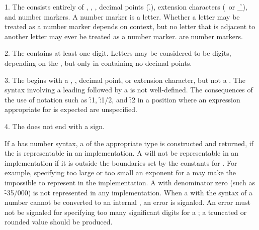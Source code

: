 \beginlist
\item{1.}
The  consists entirely of 
  ,
  ,
  ,
  decimal points (\f{.}),
  extension characters (\hat\ or \f{\_}),
  and number markers.
A number marker is a letter. 
Whether a letter may be treated as a number marker depends on context,
but no letter that is adjacent to another letter may ever be treated as a number marker.
 are number markers.

\item{2.}
The  contains at least one digit.  Letters may be considered to be
digits, depending on the , but only
in  containing no decimal points.


\item{3.}
The  begins with a , , decimal point, or extension character,
but not a 
.
The syntax involving a leading 
 followed by a  is
not well-defined. The consequences of the use 
of notation such as \f{:1}, \f{:1/2}, and \f{:2} in a
position where an expression appropriate for  
is expected are unspecified.

\item{4.}
The  does not end with a sign.
\endlist

If a  has number syntax, 
a  of the appropriate type is constructed and returned, 
if the  is representable in an implementation.
A  will not be representable in an implementation 
if it is outside the boundaries set by the  
constants for .
For example, specifying too large or too small an exponent for a 
may make the  impossible to represent in the implementation.
A  with denominator zero (such as \f{-35/000})
is not represented in any implementation.
When a  with the syntax of a number cannot be converted to an internal
, an error  is signaled.  An error
must not be signaled for specifying too many significant digits
for a ; a truncated or rounded value should be produced.

